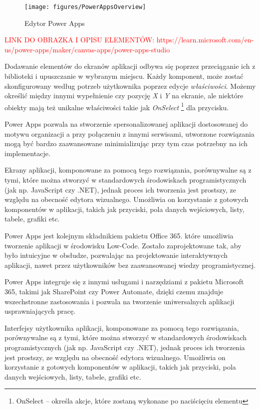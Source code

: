 \begin{figure}[h] %
    \centering
    \texttt{[image: figures/PowerAppsOverview]} 
    \caption{Edytor Power Apps} 
    \label{fig:PowerAppsEditorOverview}
\end{figure}
\textcolor{red}{LINK DO OBRAZKA I OPISU ELEMENTÓW: https://learn.microsoft.com/en-us/power-apps/maker/canvas-apps/power-apps-studio}

Dodawanie elementów do ekranów aplikacji odbywa się poprzez przeciąganie ich z biblioteki i upuszczanie w wybranym miejscu. Każdy komponent, może zostać skonfigurowany według potrzeb użytkownika poprzez edycje \emph{właściwości}. Możemy określić między innymi wypełnienie czy pozycję \emph{X} i \emph{Y} na ekranie, ale niektóre obiekty mają też unikalne właściwości takie jak \emph{OnSelect} \footnote{OnSelect -- określa akcje, które zostaną wykonane po naciścięciu elementu} dla przycisku.

Power Apps pozwala na stworzenie spersonalizowanej aplikacji dostosowanej do motywu organizacji a przy połączeniu z innymi serwisami, utworzone rozwiązania mogą być bardzo zaawansowane minimializując przy tym czas potrzebny na ich implementacje.
\vspace{15cm}

Ekrany aplikacji, komponowane za pomocą tego rozwiązania, porównywalne są z tymi, które można stworzyć w standardowych środowiskach programistycznych (jak np. JavaScript czy .NET), jednak proces ich tworzenia jest prostszy, ze względu na obecność edytora wizualnego. Umożliwia on korzystanie z gotowych komponentów w aplikacji, takich jak przyciski, pola danych wejściowych, listy, tabele, grafiki etc.




Power Apps jest kolejnym składnikiem pakietu Office 365. które umożliwia tworzenie aplikacji w środowisku Low-Code. Zostało zaprojektowane tak, aby było intuicyjne w obsłudze, pozwalając na projektowanie interaktywnych aplikacji, nawet przez użytkowników bez zaawansowanej wiedzy programistycznej.

Power Apps integruje się z innymi usługami i narzędziami z pakietu Microsoft 365, takimi jak SharePoint czy Power Automate, dzięki czemu znajduje wszechstronne zastosowania i pozwala na tworzenie uniwersalnych aplikacji usprawniających pracę.

Interfejsy użytkownika aplikacji, komponowane za pomocą tego rozwiązania, porównywalne są z tymi, które można stworzyć w standardowych środowiskach programistycznych (jak np. JavaScript czy .NET), jednak proces ich tworzenia jest prostszy, ze względu na obecność edytora wizualnego. Umożliwia on korzystanie z gotowych komponentów w aplikacji, takich jak przyciski, pola danych wejściowych, listy, tabele, grafiki etc.


